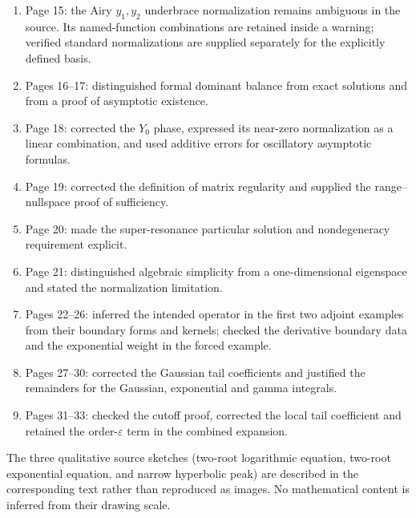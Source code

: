 \documentclass[11pt,a4paper]{article}
\newcommand{\eps}{\varepsilon}
\numberwithin{equation}{section}
\begin{document}
\begin{enumerate}
 \item Page 15: the Airy $y_1,y_2$ underbrace normalization remains
 ambiguous in the source. Its named-function combinations are retained
 inside a warning; verified standard normalizations are supplied
 separately for the explicitly defined basis.
 \item Pages 16--17: distinguished formal dominant balance from
 exact solutions and from a proof of asymptotic existence.
 \item Page 18: corrected the $Y_0$ phase, expressed its near-zero
 normalization as a linear combination, and used additive errors
 for oscillatory asymptotic formulas.
 \item Page 19: corrected the definition of matrix regularity and
 supplied the range--nullspace proof of sufficiency.
 \item Page 20: made the super-resonance particular solution and
 nondegeneracy requirement explicit.
 \item Page 21: distinguished algebraic simplicity from a
 one-dimensional eigenspace and stated the normalization limitation.
 \item Pages 22--26: inferred the intended operator in the first two
 adjoint examples from their boundary forms and kernels; checked the
 derivative boundary data and the exponential weight in the forced example.
 \item Pages 27--30: corrected the Gaussian tail coefficients and
 justified the remainders for the Gaussian, exponential and gamma integrals.
 \item Pages 31--33: checked the cutoff proof, corrected the local tail
 coefficient and retained the order-$\eps$ term in the combined expansion.
\end{enumerate}
The three qualitative source sketches (two-root logarithmic equation,
two-root exponential equation, and narrow hyperbolic peak) are
described in the corresponding text rather than reproduced as images.
No mathematical content is inferred from their drawing scale.
\endgroup
\end{document}

